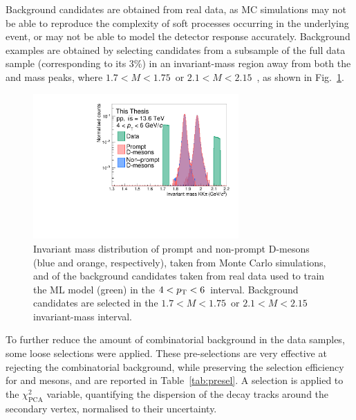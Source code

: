 Background candidates are obtained from real data, as MC simulations may not be able to reproduce the complexity of soft processes occurring in the underlying event, or may not be able to model the detector response accurately. Background examples are obtained by selecting candidates from a subsample of the full data sample (corresponding to its 3\%) in an invariant-mass region away from both the \ds and \dpl mass peaks, where $1.7 < M < 1.75$~\gevcc or \mbox{$2.1 < M < 2.15$~\gevcc}, as shown in Fig.~\ref{fig:ml_training_mass}.
\begin{figure}[htb]
    \centering
    \includegraphics[width=0.7\textwidth]{Figures/Chapter 5/Mass.pdf}
    \caption{Invariant mass distribution of prompt and non-prompt D-mesons (blue and orange, respectively), taken from Monte Carlo simulations, and of the background candidates taken from real data used to train the ML model (green) in the $4<p_\mathrm{T}<6$~\gevc interval. Background candidates are selected in the $1.7 < M < 1.75$~\gevcc or \mbox{$2.1 < M < 2.15$~\gevcc} invariant-mass interval.}
    \label{fig:ml_training_mass}
\end{figure}

To further reduce the amount of combinatorial background in the data samples, some loose selections were applied. These pre-selections are very effective at rejecting the combinatorial background, while preserving the selection efficiency for \ds and \dpl mesons, and are reported in Table~\ref{tab:presel}. A selection is applied to the $\chi^2_\mathrm{PCA}$ variable, quantifying the dispersion of the decay tracks around the secondary vertex, normalised to their uncertainty.

